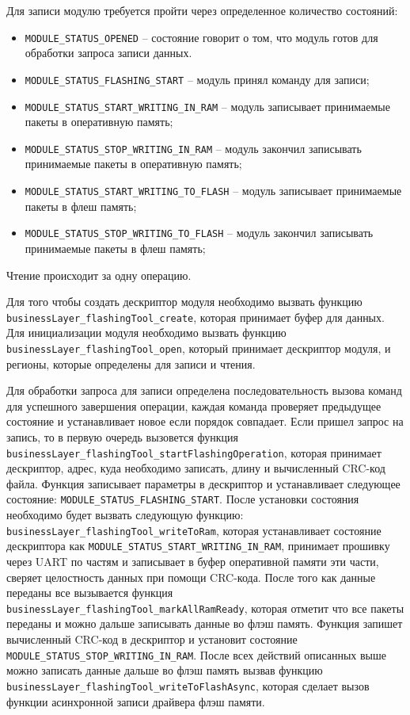 Для записи модулю требуется пройти через определенное количество состояний: 

\begin{itemize}
    \item \lstinline|MODULE_STATUS_OPENED| -- состояние говорит о том, что модуль готов для обработки запроса записи данных.
    \item \lstinline|MODULE_STATUS_FLASHING_START| -- модуль принял команду для записи;
    \item \lstinline|MODULE_STATUS_START_WRITING_IN_RAM| -- модуль записывает принимаемые пакеты в оперативную память;
    \item \lstinline|MODULE_STATUS_STOP_WRITING_IN_RAM| -- модуль закончил записывать принимаемые пакеты в оперативную память;
    \item \lstinline|MODULE_STATUS_START_WRITING_TO_FLASH| -- модуль записывает принимаемые пакеты в флеш память;
    \item \lstinline|MODULE_STATUS_STOP_WRITING_TO_FLASH| -- модуль закончил записывать принимаемые пакеты в флеш память;
\end{itemize}

Чтение происходит за одну операцию.

Для того чтобы создать дескриптор модуля необходимо вызвать функцию \lstinline|businessLayer_flashingTool_create|, которая принимает буфер для данных. Для инициализации модуля
необходимо вызвать функцию \lstinline|businessLayer_flashingTool_open|, который принимает дескриптор модуля, и регионы, которые определены для
записи и чтения.

Для обработки запроса для записи определена последовательность вызова команд для успешного завершения операции, каждая команда проверяет предыдущее состояние и устанавливает
новое если порядок совпадает. Если пришел запрос на запись, то в первую очередь вызовется функция \lstinline|businessLayer_flashingTool_startFlashingOperation|, которая
принимает дескриптор, адрес, куда необходимо записать, длину и вычисленный CRC-код файла. Функция записывает параметры в дескриптор и устанавливает следующее состояние:
\lstinline|MODULE_STATUS_FLASHING_START|. После установки состояния необходимо будет вызвать следующую функцию: \lstinline|businessLayer_flashingTool_writeToRam|, которая
устанавливает состояние дескриптора как \lstinline|MODULE_STATUS_START_WRITING_IN_RAM|,
принимает прошивку через UART по частям и записывает в буфер оперативной памяти эти части, сверяет целостность данных при помощи CRC-кода. После того как данные переданы все
вызывается функция \lstinline|businessLayer_flashingTool_markAllRamReady|, которая отметит что все пакеты переданы и можно дальше записывать данные во флэш память.
Функция запишет вычисленный CRC-код в дескриптор и установит состояние \lstinline|MODULE_STATUS_STOP_WRITING_IN_RAM|. После всех действий описанных выше можно записать данные
дальше во флэш память вызвав функцию \lstinline|businessLayer_flashingTool_writeToFlashAsync|, которая сделает вызов функции асинхронной записи драйвера флэш памяти.

